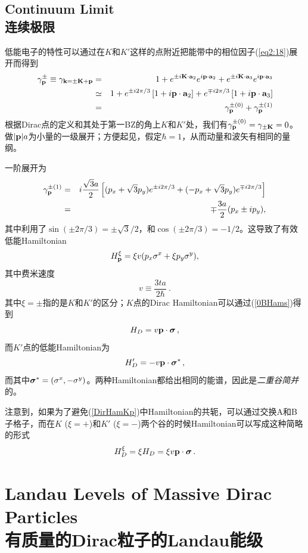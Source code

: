 \documentclass[10pt]{book}
\newcommand{\sigmab}{\mbox{\boldmath $\sigma $}}
\newcommand{\bp}{{\bf p}}
\newcommand{\bk}{{\bf k}}
\newcommand{\ba}{{\bf a}}
\newcommand{\bK}{{\bf K}}
\newcommand{\beq}{\begin{equation}}
\newcommand{\beqn}{\begin{eqnarray}}
\newcommand{\eeq}{\end{equation}}
\newcommand{\eeqn}{\end{eqnarray}}
\newcommand{\nn}{\nonumber}
\newcommand\itt{\it\color{blue}}
\begin{document}
\section*{Continuum Limit\\\bf 连续极限}

低能电子的特性可以通过在$K$和$K'$这样的点附近把能带中的相位因子(\ref{eq2:18})展开而得到
\beqn\label{eq2:30}
\nn
\gamma_{\bp}^{\pm}\equiv \gamma_{\bk=\pm \bK+\bp} &=& 1 + e^{\pm i\bK\cdot\ba_2}
e^{i\bp\cdot\ba_2} + e^{\pm i\bK\cdot\ba_3}e^{i\bp\cdot\ba_3}
\\
\nn
&\simeq& 1 + e^{\pm i 2\pi/3}\left[1 + i\bp\cdot\ba_2\right] + e^{\mp i 2\pi/3}\left[1 + i\bp\cdot\ba_3 \right] \\
\nn
&=& \gamma_{\bp}^{\pm (0)}+\gamma_{\bp}^{\pm (1)}
\eeqn
根据Dirac点的定义和其处于第一BZ的角上$K$和$K'$处，我们有$\gamma_{\bp}^{\pm (0)}=\gamma_{\pm\bK}=0$。做$|\bp|a$为小量的一级展开；方便起见，假定$\hbar=1$，从而动量和波矢有相同的量纲。

一阶展开为
\beqn\label{eq2:31}
\nn
\gamma_{\bp}^{\pm (1)} &=& i\frac{\sqrt{3}a}{2}\left[(p_x+\sqrt{3}p_y)e^{\pm i2\pi/3}
+ (-p_x+\sqrt{3}p_y)e^{\mp i2\pi/3} \right]\\
&=& \mp \frac{3a}{2}(p_x \pm i p_y),
\eeqn
其中利用了$\sin(\pm 2\pi/3)=\pm \sqrt{3}/2$，和$\cos(\pm 2\pi/3)=-1/2$。这导致了有效低能Hamiltonian
\beq\label{eq2:32}
H_{\bp}^{\xi}=\xi v(p_x\sigma^x + \xi p_y\sigma^y),
\eeq
其中费米速度
\beq\label{eq2:32b}
v \equiv \frac{3ta}{2\hbar}\ .
\eeq
其中$\xi=\pm $指的是$K$和$K'$的区分；$K$点的Dirac Hamiltonian可以通过(\ref{0BHams})得到
\beq\label{DirHamK}
H_D=v\bp\cdot\sigmab\, ,
\eeq
而$K'$点的低能Hamiltonian为
\beq\label{DirHamKp}
H_D^{\prime}=-v\bp\cdot\sigmab^*\, ,
\eeq
而其中$\sigmab^*=(\sigma^x,-\sigma^y)$。两种Hamiltonian都给出相同的能谱，因此是{\itt 二重谷简并}的。

注意到，如果为了避免(\ref{DirHamKp})中Hamiltonian的共轭，可以通过交换A和B子格子，而在$K$ ($\xi=+$)和$K'$ ($\xi=-$)两个谷的时候Hamiltonian可以写成这种简略的形式
\beq\label{DirHamBis}
H_D^{\xi}=\xi H_D=\xi v\bp\cdot\sigmab\, .
\eeq


\chapter[有质量的Dirac粒子的Landau能级]{Landau Levels of Massive Dirac Particles\\\bf 有质量的Dirac粒子的Landau能级}
\label{MassLL}


\end{document}
